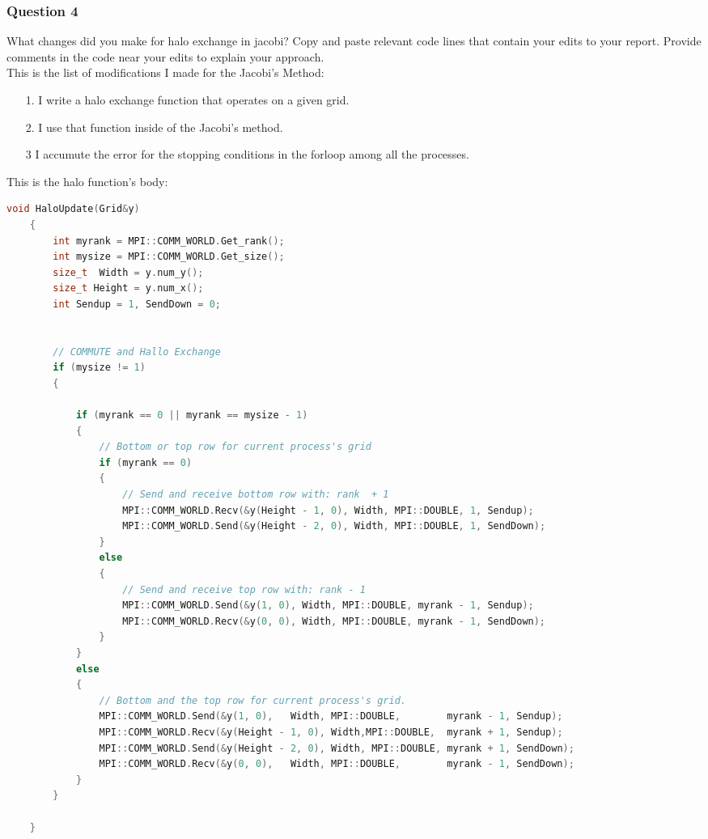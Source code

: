 \documentclass[]{article}
\begin{document}
            \subsubsection*{Question 4}\label{question4}
                What changes did you make for halo exchange in jacobi? Copy and paste relevant code lines that contain your edits to your report. Provide comments in the code near your edits to explain your approach.
                \\[1.1em]
                This is the list of modifications I made for the Jacobi's Method: 
                \begin{enumerate}
                    \item[1.] I write a halo exchange function that operates on a given grid. 
                    \item[2.] I use that function inside of the Jacobi's method. 
                    \item[3 ] I accumute the error for the stopping conditions in the forloop among all the processes. 
                \end{enumerate}
                This is the halo function's body: 
                \begin{lstlisting}[language=c]
    void HaloUpdate(Grid&y)
    {
        int myrank = MPI::COMM_WORLD.Get_rank();
        int mysize = MPI::COMM_WORLD.Get_size();
        size_t  Width = y.num_y();
        size_t Height = y.num_x();
        int Sendup = 1, SendDown = 0;


        // COMMUTE and Hallo Exchange
        if (mysize != 1)
        {
            
            if (myrank == 0 || myrank == mysize - 1)
            {   
                // Bottom or top row for current process's grid
                if (myrank == 0)
                {
                    // Send and receive bottom row with: rank  + 1
                    MPI::COMM_WORLD.Recv(&y(Height - 1, 0), Width, MPI::DOUBLE, 1, Sendup);
                    MPI::COMM_WORLD.Send(&y(Height - 2, 0), Width, MPI::DOUBLE, 1, SendDown); 
                }   
                else
                {
                    // Send and receive top row with: rank - 1
                    MPI::COMM_WORLD.Send(&y(1, 0), Width, MPI::DOUBLE, myrank - 1, Sendup); 
                    MPI::COMM_WORLD.Recv(&y(0, 0), Width, MPI::DOUBLE, myrank - 1, SendDown);
                }
            }
            else
            {   
                // Bottom and the top row for current process's grid. 
                MPI::COMM_WORLD.Send(&y(1, 0),   Width, MPI::DOUBLE,        myrank - 1, Sendup);
                MPI::COMM_WORLD.Recv(&y(Height - 1, 0), Width,MPI::DOUBLE,  myrank + 1, Sendup); 
                MPI::COMM_WORLD.Send(&y(Height - 2, 0), Width, MPI::DOUBLE, myrank + 1, SendDown);
                MPI::COMM_WORLD.Recv(&y(0, 0),   Width, MPI::DOUBLE,        myrank - 1, SendDown); 
            }
        }

    }
                \end{lstlisting}          
\end{document}

